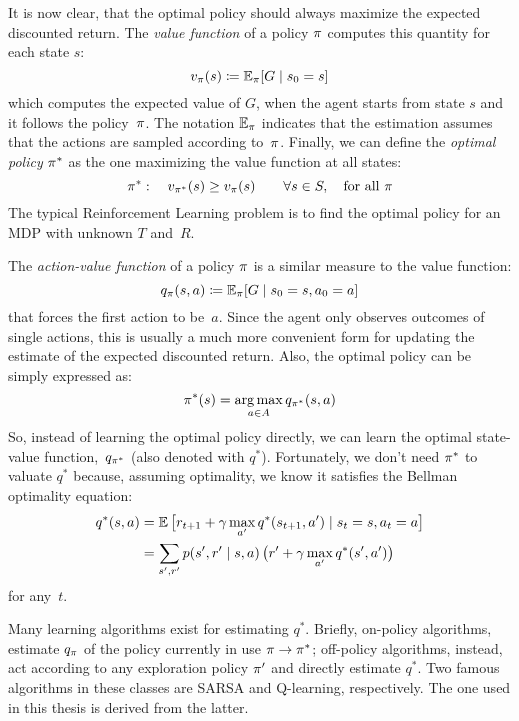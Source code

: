 It is now clear, that the optimal policy should always maximize the expected
discounted return. The \emph{value function} of a policy $\pi$ computes
this quantity for each state $s$:
\begin{equation}
	v_{\pi}(s) \coloneqq \mathbb{E}_{\pi}[G \mid s_0 = s]
\end{equation}
which computes the expected value of $G$, when the agent starts from state $s$
and it follows the policy~$\pi$. The notation $\mathbb{E}_{\pi}$ indicates
that the estimation assumes that the actions are sampled according
to~$\pi$. Finally, we can define the \emph{optimal policy} $\pi^*$ as
the one maximizing the value function at all states:
\begin{equation}
	\pi^*: \quad v_{\pi^*}(s) \ge v_{\pi}(s) \qquad \forall s \in
	S, \quad \text{for all $\pi$}
\end{equation}
The typical Reinforcement Learning problem is to find the optimal policy for
an MDP with unknown $T$ and~$R$.

The \emph{action-value function} of a policy $\pi$ is a similar measure to
the value function:
\begin{equation}
	q_{\pi}(s, a) \coloneqq \mathbb{E}_{\pi}[G \mid s_0 = s, a_0 = a]
\end{equation}
that forces the first action to be~$a$. Since the agent only observes outcomes
of single actions, this is usually a much more convenient form for updating
the estimate of the expected discounted return. Also, the optimal policy can
be simply expressed as:
\begin{equation}
	\pi^*(s) = \operatorname*{arg\,max}_{a \in A} q_{\pi^*}(s, a)
\end{equation}
So, instead of learning the optimal policy directly, we can learn the optimal
state-value function,~$q_{\pi^*}$ (also denoted with $q^*$). Fortunately,
we don't need $\pi^*$ to valuate $q^*$ because, assuming optimality, we
know it satisfies the Bellman optimality equation:
\begin{align}
	q^*(s, a) &= \mathbb{E}\, \bigl[ r_{t+1} + \gamma \max_{a'} q^*(s_{t+1}, a')
	\mid s_t = s, a_t = a \bigr] \\
	&= \sum_{s', r'} p(s', r' \mid s, a) \,
	\bigl( r' + \gamma \max_{a'} q^*(s', a') \bigr)
\end{align}
for any~$t$.

Many learning algorithms exist for estimating $q^*$. Briefly, on-policy
algorithms, estimate $q_\pi$ of the policy currently in use $\pi \to
\pi^*$; off-policy algorithms, instead, act according to any exploration
policy $\pi'$ and directly estimate $q^*$. Two famous algorithms in these
classes are SARSA and Q-learning, respectively. The one used in this thesis is
derived from the latter.


